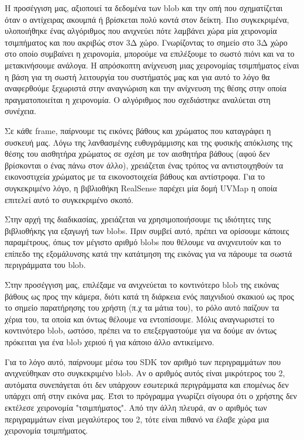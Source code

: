 Η προσέγγιση μας, αξιοποιεί τα δεδομένα των blob και την οπή που σχηματίζεται όταν ο αντίχειρας ακουμπά ή βρίσκεται πολύ κοντά στον δείκτη. Πιο συγκεκριμένα, υλοποιήθηκε ένας αλγόριθμος που ανιχνεύει πότε λαμβάνει χώρα μία χειρονομία τσιμπήματος και που ακριβώς στον 3Δ χώρο. Γνωρίζοντας το σημείο στο 3Δ χώρο στο οποίο συμβαίνει η χειρονομία, μπορούμε να επιλέξουμε το σωστό πιόνι και να το μετακινήσουμε ανάλογα. Η απρόσκοπτη ανίχνευση μιας χειρονομίας τσιμπήματος είναι η βάση για τη σωστή λειτουργία του συστήματός μας και για αυτό το λόγο θα αναφερθούμε ξεχωριστά στην αναγνώριση και την ανίχνευση της θέσης στην οποία πραγματοποιείται η χειρονομία. Ο αλγόριθμος που σχεδιάστηκε αναλύεται στη συνέχεια.



Σε κάθε frame, παίρνουμε τις εικόνες βάθους και χρώματος που καταγράφει η συσκευή μας. Λόγω της λανθασμένης ευθυγράμμισης και της φυσικής απόκλισης της θέσης του αισθητήρα χρώματος σε σχέση με τον αισθητήρα βάθους (αφού δεν βρίσκονται ο ένας πάνω στον άλλο), χρειάζεται ένας τρόπος να αντιστοιχηθούν τα εικονοστιχεία χρώματος με τα εικονοστοιχεία βάθους και αντίστροφα. Για το συγκεκριμένο λόγο, η βιβλιοθήκη RealSense παρέχει μία δομή UVMap η οποία επιτελεί αυτό το συγκεκριμένο σκοπό.

Στην αρχή της διαδικασίας, χρειάζεται να χρησιμοποιήσουμε τις ιδιότητες τιης βιβλιοθήκης για εξαγωγή των blobs. Πριν συμβεί αυτό, πρέπει να ορίσουμε κάποιες παραμέτρους, όπως τον μέγιστο αριθμό blobs που θέλουμε να ανιχνευτούν και το επίπεδο της εξομάλυνσης κατά την κατάτμηση της εικόνας για να πάρουμε τα σωστά περιγράμματα του blob. 

Στην προσέγγιση μας, επιλέξαμε να ανιχνεύεται το κοντινότερο blob της εικόνας βάθους ως προς την κάμερα, διότι κατά τη διάρκεια ενός παιχνιδιού σκακιού ως προς το σημείο παρατήρησης του χρήστη (π.χ τα μάτια του), το ρόλο αυτό παίζουν τα χέρια του, τα οποία και όντως θέλουμε να εντοπίσουμε. Μόλις αναγνωριστεί το κοντινότερο blob, ωστόσο, πρέπει να το επεξεργαστούμε για να δούμε αν όντως πρόκειται για ένα blob χεριού ή για κάποιο άλλο αντικείμενο.


Για το λόγο αυτό, παίρνουμε μέσω του SDK τον αριθμό των περιγραμμάτων που ανιχνεύθηκαν στο συγκεκριμένο blob. Αν ο αριθμός αυτός είναι μικρότερος του 2, αυτόματα συνεπάγεται ότι δεν υπάρχουν εσωτερικά περιγράμματα και επομένως δεν υπάρχει οπή στην εικόνα μας. Έτσι το πρόγραμμα γνωρίζει σίγουρα ότι ο χρήστης δεν εκτέλεσε χειρονομία "τσιμπήματος". Από την άλλη πλευρά, αν ο αριθμός των περιγραμμάτων είναι μεγαλύτερος του 2, τότε είναι πιθανό να έλαβε χώρα μια χειρονομία τσιμπήματος. 


